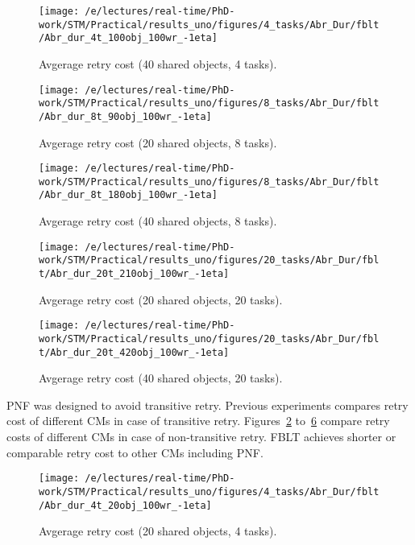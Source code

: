 \documentclass[prodmode,acmtecs]{acmsmall}
\begin{document}
\begin{compactenum}
\begin{figure}
\centering
\texttt{[image: /e/lectures/real-time/PhD-work/STM/Practical/results\_uno/figures/4\_tasks/Abr\_Dur/fblt/Abr\_dur\_4t\_100obj\_100wr\_-1eta]}
\caption{Avgerage retry cost (40 shared objects, 4 tasks).}
\label{fig-RC-fblt-4t-40obj}
\end{figure}

\begin{figure}
\centering
\texttt{[image: /e/lectures/real-time/PhD-work/STM/Practical/results\_uno/figures/8\_tasks/Abr\_Dur/fblt/Abr\_dur\_8t\_90obj\_100wr\_-1eta]}
\caption{Avgerage retry cost (20 shared objects, 8 tasks).}
\label{fig-RC-fblt-8t-20obj}
\end{figure}

\begin{figure}
\centering
\texttt{[image: /e/lectures/real-time/PhD-work/STM/Practical/results\_uno/figures/8\_tasks/Abr\_Dur/fblt/Abr\_dur\_8t\_180obj\_100wr\_-1eta]}
\caption{Avgerage retry cost (40 shared objects, 8 tasks).}
\label{fig-RC-fblt-8t-40obj}
\end{figure}

\begin{figure}
\centering
\texttt{[image: /e/lectures/real-time/PhD-work/STM/Practical/results\_uno/figures/20\_tasks/Abr\_Dur/fblt/Abr\_dur\_20t\_210obj\_100wr\_-1eta]}
\caption{Avgerage retry cost (20 shared objects, 20 tasks).}
\label{fig-RC-fblt-20t-20obj}
\end{figure}

\begin{figure}
\centering
\texttt{[image: /e/lectures/real-time/PhD-work/STM/Practical/results\_uno/figures/20\_tasks/Abr\_Dur/fblt/Abr\_dur\_20t\_420obj\_100wr\_-1eta]}
\caption{Avgerage retry cost (40 shared objects, 20 tasks).}
\label{fig-RC-fblt-20t-40obj}
\end{figure}

PNF was designed to avoid transitive retry. Previous experiments compares retry cost of different CMs in case of transitive retry. Figures~\ref{fig-RC-fblt-8t-20obj} to~\ref{fig-RC-fblt-20t-20obj}  compare retry costs of different CMs in case of non-transitive retry. FBLT achieves shorter or comparable retry cost to other CMs including PNF.

\begin{figure}
\centering
\texttt{[image: /e/lectures/real-time/PhD-work/STM/Practical/results\_uno/figures/4\_tasks/Abr\_Dur/fblt/Abr\_dur\_4t\_20obj\_100wr\_-1eta]}
\caption{Avgerage retry cost (20 shared objects, 4 tasks).}
\label{fig-RC-fblt-20t-20obj}
\end{figure}


\end{compactenum}
\end{document}

